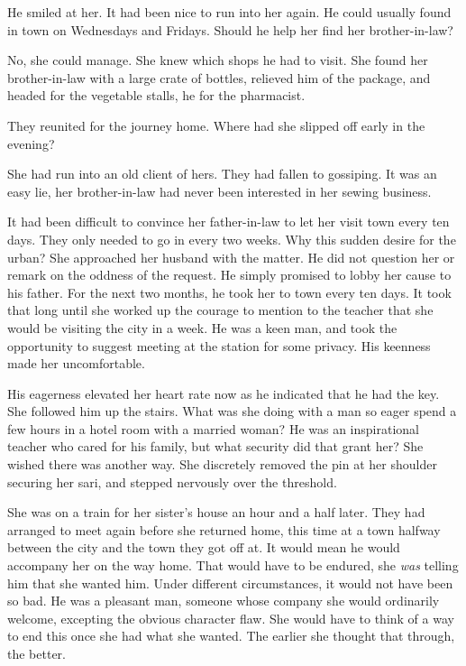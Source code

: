 \documentclass{article}
\begin{document}
He smiled at her. It had been nice to run into her again. He could usually found in town on Wednesdays and Fridays. Should he help her find her brother-in-law?

No, she could manage. She knew which shops he had to visit. She found her brother-in-law with a large crate of bottles, relieved him of the package, and headed for the vegetable stalls, he for the pharmacist. 

They reunited for the journey home. Where had she slipped off early in the evening?

She had run into an old client of hers. They had fallen to gossiping. It was an easy lie, her brother-in-law had never been interested in her sewing business. 

It had been difficult to convince her father-in-law to let her visit town every ten days. They only needed to go in every two weeks. Why this sudden desire for the urban? She approached her husband with the matter. He did not question her or remark on the oddness of the request. He simply promised to lobby her cause to his father. For the next two months, he took her to town every ten days. It took that long until she worked up the courage to mention to the teacher that she would be visiting the city in a week. He was a keen man, and took the opportunity to suggest meeting at the station for some privacy. 
His keenness made her uncomfortable.  

His eagerness elevated her heart rate now as he indicated that he had the key. She followed him up the stairs. What was she doing with a man so eager spend a few hours in a hotel room with a married woman? He was an inspirational teacher who cared for his family, but what security did that grant her? She wished there was another way. She discretely removed the pin at her shoulder securing her sari, and stepped nervously over the threshold. 

She was on a train for her sister's house an hour and a half later. They had arranged to meet again before she returned home, this time at a town halfway between the city and the town they got off at. It would mean he would accompany her on the way home. That would have to be endured, she \emph{was} telling him that she wanted him. Under different circumstances, it would not have been so bad. He was a pleasant man, someone whose company she would ordinarily welcome, excepting the obvious character flaw. She would have to think of a way to end this once she had what she wanted. The earlier she thought that through, the better.
\end{document}

